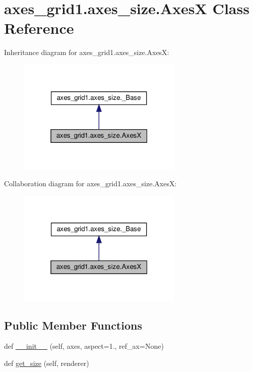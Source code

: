 \hypertarget{classaxes__grid1_1_1axes__size_1_1AxesX}{}\section{axes\+\_\+grid1.\+axes\+\_\+size.\+AxesX Class Reference}
\label{classaxes__grid1_1_1axes__size_1_1AxesX}


Inheritance diagram for axes\+\_\+grid1.\+axes\+\_\+size.\+AxesX\+:
\nopagebreak
\begin{figure}[H]
\begin{center}
\leavevmode
\includegraphics[width=223pt]{classaxes__grid1_1_1axes__size_1_1AxesX__inherit__graph}
\end{center}
\end{figure}


Collaboration diagram for axes\+\_\+grid1.\+axes\+\_\+size.\+AxesX\+:
\nopagebreak
\begin{figure}[H]
\begin{center}
\leavevmode
\includegraphics[width=223pt]{classaxes__grid1_1_1axes__size_1_1AxesX__coll__graph}
\end{center}
\end{figure}
\subsection*{Public Member Functions}
\begin{DoxyCompactItemize}
\item 
def \hyperlink{classaxes__grid1_1_1axes__size_1_1AxesX_ab06a14cbef6a2094159daca912b4bf53}{\+\_\+\+\_\+init\+\_\+\+\_\+} (self, axes, aspect=1., ref\+\_\+ax=None)
\item 
def \hyperlink{classaxes__grid1_1_1axes__size_1_1AxesX_afea200af25aa67feed0d5e15832929a0}{get\+\_\+size} (self, renderer)
\end{DoxyCompactItemize}


